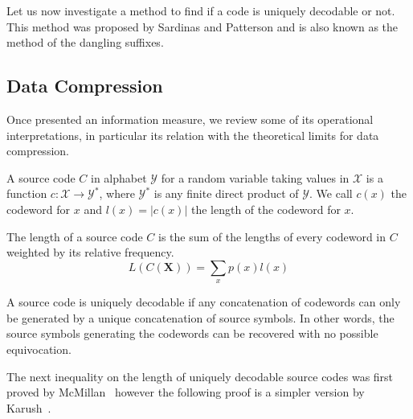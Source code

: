 Let us now investigate a method to find if a code is uniquely decodable or not. This method was proposed by Sardinas and Patterson \cite{} and is also known as the method of the dangling suffixes. 


\subsection{Data Compression}
Once presented an information measure, we review some of its operational interpretations, in particular its relation with the theoretical limits for data compression.

A source code $C$ in alphabet $\mathcal{Y}$ for a random variable taking values in $\mathcal{X}$ is a function $c:\mathcal{X}\longrightarrow \mathcal{Y}^*$, where $\mathcal{Y}^*$ is any finite direct product of $\mathcal{Y}$. We call $c(x)$ the codeword for $x$ and $l(x)=|c(x)|$ the length of the codeword for $x$.

The length of a source code $C$ is the sum of the lengths of every codeword in $C$ weighted by its relative frequency.
\begin{equation}
L(C(\mathbf X)) = \sum_{x} p(x) l(x)
\end{equation}

A source code is uniquely decodable if any concatenation of codewords can only be generated by a unique concatenation of source symbols. In other words, the source symbols generating the codewords can be recovered with no possible equivocation. 

The next inequality on the length of uniquely decodable source codes was first proved by McMillan~\cite{McMillan_56} however the following proof is a simpler version by Karush~\cite{Karush_61,Cover_91}.

